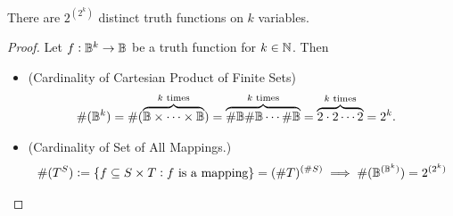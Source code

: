 \begin{tcolorbox}[colframe=procolor,title={\color{white}\bf Count of Truth Functions}]
\begin{proposition}
There are $2^{(2^k)}$ distinct truth functions on $k$ variables.
\end{proposition}
\end{tcolorbox}
\begin{proof}
Let $f:\mathbb{B}^k\to\mathbb{B}$ be a truth function for $k\in\mathbb{N}$. Then
\begin{itemize}
	\item[] (Cardinality of Cartesian Product of Finite Sets)
	\begin{align*}
		\#(\mathbb{B}^k)&=\#(\overbrace{\mathbb{B}\times\cdots\times\mathbb{B}}^{\text{$k$ times}})
		=\overbrace{\#\mathbb{B}\#\mathbb{B}\cdots\#\mathbb{B}}^{\text{$k$ times}}
		=\overbrace{2\cdot 2\cdots2}^{\text{$k$ times}}
		=2^k.
	\end{align*}
	\item[] (Cardinality of Set of All Mappings.)
	\begin{align*}
	\#(T^S):=\set{f\subseteq S\times T:\text{$f$ is a mapping}}=(\# T)^{(\# S)}
	\implies \#(\mathbb{B}^{(\mathbb{B}^k)})=2^{(2^k)}
	\end{align*}
\end{itemize}
\end{proof}

